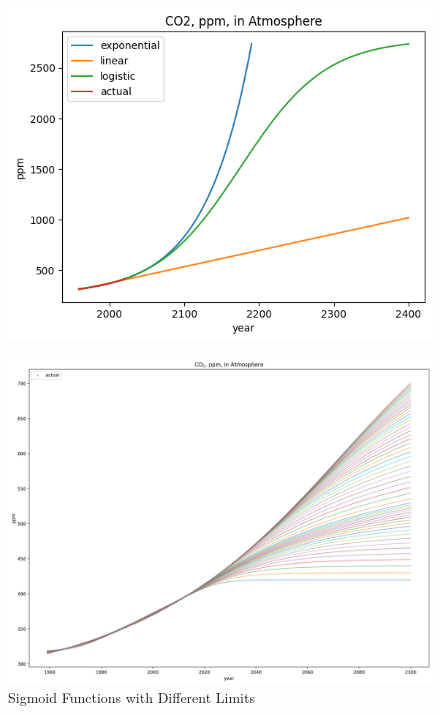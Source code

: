 \documentclass[12pt]{mcmthesis}
\begin{document}
    \begin{figure}[h]
        \begin{minipage}{0.5\linewidth}
            \centering
            \includegraphics[width=\textwidth]{logistic_2400}%
            \label{fig:co2_logi_2400}
        \end{minipage}%
        \begin{minipage}{0.5\linewidth}
            \centering
            \includegraphics[width=\textwidth]{co2_sigm_all}%
            \caption{Sigmoid Functions with Different Limits}
            \label{fig:co2_sigm_all}
        \end{minipage}
    \end{figure}
\end{document}
